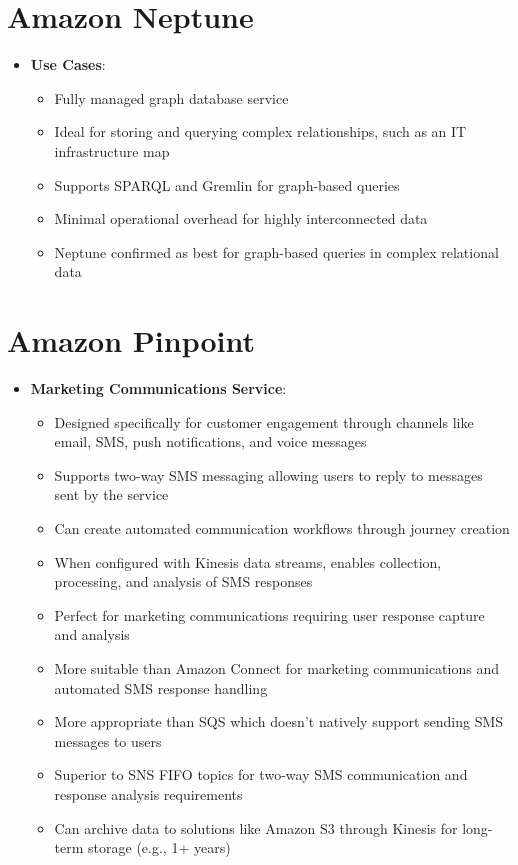 \documentclass[11pt,a4paper]{report}
\begin{document}
\section{Amazon Neptune}

\begin{itemize}
  \item \textbf{Use Cases}:
\begin{itemize}
  \item Fully managed graph database service
  \item Ideal for storing and querying complex relationships, such as an IT infrastructure map
  \item Supports SPARQL and Gremlin for graph-based queries
  \item Minimal operational overhead for highly interconnected data
  \item Neptune confirmed as best for graph-based queries in complex relational data
\end{itemize}
\end{itemize}


\section{Amazon Pinpoint}

\begin{itemize}
  \item \textbf{Marketing Communications Service}:
\begin{itemize}
  \item Designed specifically for customer engagement through channels like email, SMS, push notifications, and voice messages
  \item Supports two-way SMS messaging allowing users to reply to messages sent by the service
  \item Can create automated communication workflows through journey creation
  \item When configured with Kinesis data streams, enables collection, processing, and analysis of SMS responses
  \item Perfect for marketing communications requiring user response capture and analysis
  \item More suitable than Amazon Connect for marketing communications and automated SMS response handling
  \item More appropriate than SQS which doesn't natively support sending SMS messages to users
  \item Superior to SNS FIFO topics for two-way SMS communication and response analysis requirements
  \item Can archive data to solutions like Amazon S3 through Kinesis for long-term storage (e.g., 1+ years)
\end{itemize}
\end{itemize}
\end{document}
